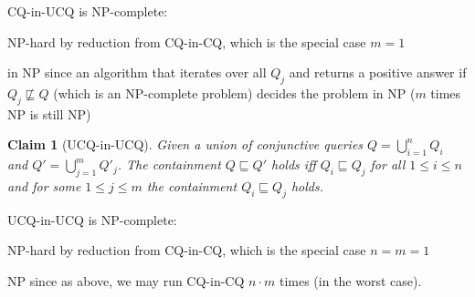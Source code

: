 \documentclass[a4paper,12pt]{article}
\newtheorem{claim}{Claim}
\begin{document}
CQ-in-UCQ is NP-complete:

\begin{description}
\item{NP-hard} by reduction from CQ-in-CQ, which is the special case $m = 1$
\item{in NP} since an algorithm that iterates over all $Q_j$ and returns a positive answer if $Q_j \not \sqsubseteq Q$ (which is an NP-complete problem) decides the problem in NP ($m$ times NP is still NP)
\end{description}

\begin{claim}[UCQ-in-UCQ]
Given a union of conjunctive queries $Q = \bigcup_{i=1}^n Q_i$ and $Q' = \bigcup_{j=1}^m Q'_j$. The containment $Q \sqsubseteq Q'$ holds iff $Q_i \sqsubseteq Q_j$ for all $1 \leq i \leq n$ and for some $1 \leq j \leq m$ the containment $Q_i \sqsubseteq Q_j$ holds.
\end{claim}

UCQ-in-UCQ is NP-complete:

\begin{description}
\item{NP-hard} by reduction from CQ-in-CQ, which is the special case $n = m = 1$
\item{NP} since as above, we may run CQ-in-CQ $n \cdot m$ times (in the worst case).
\end{description}
\end{document}
